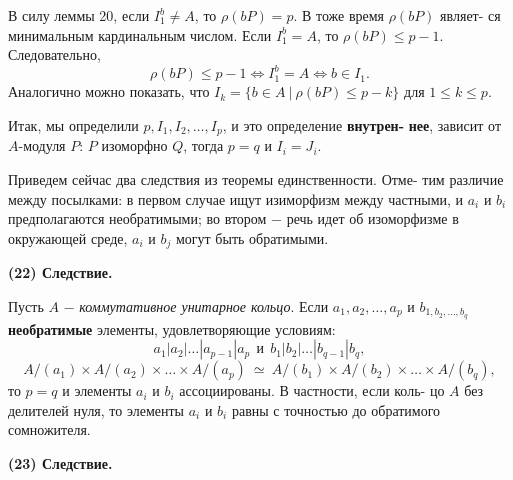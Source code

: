 	
	\noindent
	В силу леммы 20, если $I^{b}_{1} \neq A$, то $\rho (bP) = p$. В тоже время $\rho (bP)$ являет-\linebreak
	ся минимальным кардинальным числом. Если $I^{b}_{1} = A$, то $\rho (bP) \leqslant p - 1$.\linebreak
	Следовательно,
	$$\rho (bP) \leqslant p - 1 \Longleftrightarrow I^{b}_{1} = A \Longleftrightarrow b \in I_{1}.$$
	Аналогично можно показать, что $I_{k} = \{b \in A \ | \ \rho (bP) \leqslant p - k \}$ для\linebreak
	$1 \leqslant k \leqslant p$.
	
	Итак, мы определили $p, I_{1}, I_{2}, \ldots, I_{p}$, и это определение {\bf внутрен-}\linebreak
	{\bf нее}, зависит от $A$-модуля $P$: $P$ изоморфно $Q$, тогда $p = q$ и $I_{i} = J_{i}$.
	
	Приведем сейчас два следствия из теоремы единственности. Отме-\linebreak
	тим различие между посылками: в первом случае ищут изиморфизм\linebreak
	между частными, и $a_{i}$ и $b_{i}$ предполагаются необратимыми; во втором\linebreak
	$-$ речь идет об изоморфизме в окружающей среде, $a_{i}$ и $b_{j}$ могут быть\linebreak
	обратимыми.
	
	\noindent
	{\bf (22) Следствие.}
	
	Пусть $A$ $-$ {\it коммутативное унитарное кольцо}. Если $a_{1}, a_{2}, \ldots, a_{p}$ и\linebreak
	$b_{1, b_{2}, \ldots, b_{q}}$ {\bf необратимые} элементы, удовлетворяющие условиям:
	$$a_{1} |a_{2}|\ldots |a_{p - 1}|a_{p} \ \ \text{и} \ \ b_{1} |b_{2}|\ldots |b_{q - 1}|b_{q},$$
	$$A/(a_{1}) \times A/(a_{2}) \times \ldots \times A/(a_{p}) \ \simeq \ A/(b_{1}) \times A/(b_{2}) \times \ldots \times A/(b_{q}),$$
	то $p = q$ и элементы $a_{i}$ и $b_{i}$ ассоциированы. В частности, если коль-\linebreak
	цо $A$ без делителей нуля, то элементы $a_{i}$ и $b_{i}$ равны с точностью до\linebreak
	обратимого сомножителя.
	
	\noindent
	{\bf (23) Следствие.}
	
